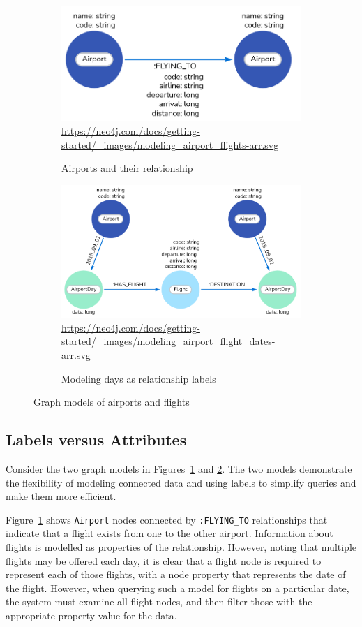 \begin{figure}
\centering
\begin{subfigure}{\textwidth}
    \centering
    \includegraphics[width=.5\textwidth]{screen7.png} \\
    \scriptsize{\url{https://neo4j.com/docs/getting-started/_images/modeling_airport_flights-arr.svg}}
    \caption{Airports and their relationship}
    \label{fig:flexiblegraph1}
\end{subfigure}
\hfill
\begin{subfigure}{\textwidth}
    \centering
    \includegraphics[width=.75\textwidth]{screen8.png} \\
    \scriptsize{\url{https://neo4j.com/docs/getting-started/_images/modeling_airport_flight_dates-arr.svg}}
    \caption{Modeling days as relationship labels}
    \label{fig:flexiblegraph2}
\end{subfigure}
\hfill
\caption{Graph models of airports and flights}
\label{fig:airportmodels}
\end{figure}

\subsection*{Labels versus Attributes} 

Consider the two graph models in Figures~\ref{fig:flexiblegraph1} and \ref{fig:flexiblegraph2}. The two models demonstrate the flexibility of modeling connected data and using labels to simplify queries and make them more efficient.

Figure~\ref{fig:flexiblegraph1} shows \texttt{Airport} nodes connected by \texttt{:FLYING\_TO} relationships that indicate that a flight exists from one to the other airport. Information about flights is modelled as properties of the relationship. However, noting that multiple flights may be offered each day, it is clear that a flight node is required to represent each of those flights, with a node property that represents the date of the flight. However, when querying such a model for flights on a particular date, the system must examine all flight nodes, and then filter those with the appropriate property value for the data. 

